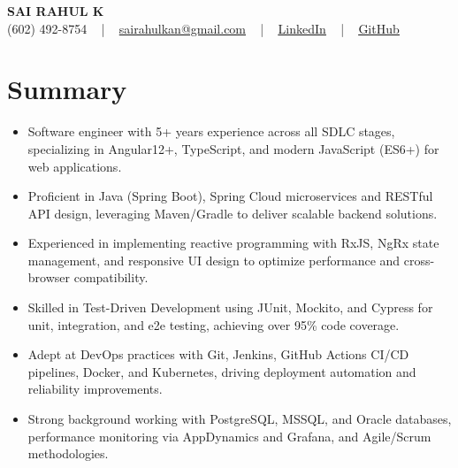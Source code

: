 \documentclass[letterpaper,11pt]{article}
\newcommand{\resumeItem}[1]{
  \item\footnotesize{
    {#1 \vspace{-2pt}}
  }
}
\newcommand{\resumeItemListStart}{\begin{itemize}[leftmargin=*]}
\newcommand{\resumeItemListEnd}{\end{itemize}\vspace{-5pt}}
\begin{document}
\begin{center}
    {\fontsize{14pt}{12pt}\selectfont \textbf{\MakeUppercase{Sai Rahul K}}}\\ \vspace{2pt}
    \fontsize{10pt}{12pt}\selectfont (602) 492-8754 ~ | ~ \href{mailto:sairahulkan@gmail.com}{sairahulkan@gmail.com} ~ | ~
    \href{https://www.linkedin.com/in/rq123/}{\color{blue}\underline{LinkedIn}} ~ | ~
    \href{https://github.com/kanrahuldo}{\color{blue}\underline{GitHub}}~
    \vspace{-8pt}
\end{center}

\section{Summary}
\fontsize{9pt}{10pt}\selectfont
\resumeItemListStart
    \resumeItem{Software engineer with 5+ years experience across all SDLC stages, specializing in Angular12+, TypeScript, and modern JavaScript (ES6+) for web applications.}
    \resumeItem{Proficient in Java (Spring Boot), Spring Cloud microservices and RESTful API design, leveraging Maven/Gradle to deliver scalable backend solutions.}
    \resumeItem{Experienced in implementing reactive programming with RxJS, NgRx state management, and responsive UI design to optimize performance and cross-browser compatibility.}
    \resumeItem{Skilled in Test-Driven Development using JUnit, Mockito, and Cypress for unit, integration, and e2e testing, achieving over 95\% code coverage.}
    \resumeItem{Adept at DevOps practices with Git, Jenkins, GitHub Actions CI/CD pipelines, Docker, and Kubernetes, driving deployment automation and reliability improvements.}
    \resumeItem{Strong background working with PostgreSQL, MSSQL, and Oracle databases, performance monitoring via AppDynamics and Grafana, and Agile/Scrum methodologies.}
\resumeItemListEnd
\vspace{-6pt}
\end{document}
